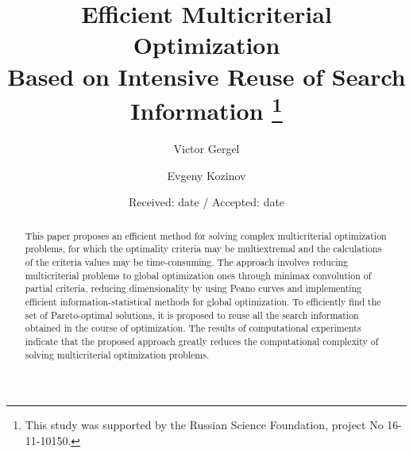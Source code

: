 \documentclass[smallcondensed]{svjour3}     %
\begin{document}

\title{Efficient Multicriterial Optimization \\
Based on Intensive Reuse of Search Information
\thanks{This study was supported by the Russian Science Foundation, project No 16-11-10150.}
}


\author{Victor Gergel         \and
        Evgeny Kozinov 
}



\date{Received: date / Accepted: date}


\maketitle


\begin{abstract}

This paper proposes an efficient method for solving complex multicriterial optimization problems, for which the optimality criteria may be multiextremal and the calculations of the criteria values may be time-consuming. The approach involves reducing multicriterial problems to global optimization ones through minimax convolution of partial criteria, reducing dimensionality by using Peano curves and implementing efficient information-statistical methods for global optimization. To efficiently find the set of Pareto-optimal solutions, it is proposed to reuse all the search information obtained in the course of optimization. The results of computational experiments indicate that the proposed approach greatly reduces the computational complexity of solving multicriterial optimization problems.


\end{abstract}
\end{document}
